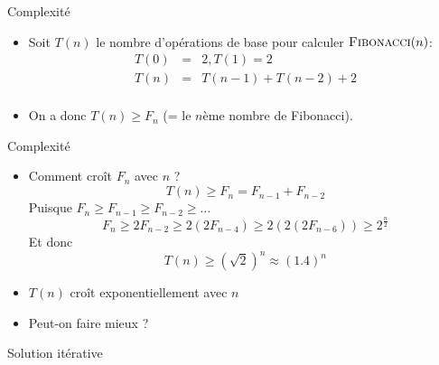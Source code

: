 \begin{frame}{Complexité}
\begin{center}
\end{center}

\bigskip

\begin{itemize}
\item Soit $T(n)$ le nombre d'opérations de base pour calculer $\textnormal{\scshape Fibonacci}(n)$:
\begin{eqnarray*}
T(0) & = & 2, T(1)=2\\
T(n) & = & T(n-1)+T(n-2)+2\\
\end{eqnarray*}
\item On a donc $T(n)\geq F_n$ (= le $n$ème nombre de Fibonacci).
\end{itemize}

\end{frame}

\begin{frame}{Complexité}

\begin{itemize}
\item Comment croît $F_n$ avec $n$ ?
$$T(n)\geq F_n=F_{n-1}+F_{n-2}$$
Puisque $F_n\geq F_{n-1}\geq F_{n-2}\geq\ldots$
$$F_n\geq 2 F_{n-2}\geq 2(2 F_{n-4})\geq 2(2(2 F_{n-6})) \geq 2^{\frac{n}{2}}$$
Et donc
$$T(n)\geq (\sqrt{2})^n \approx (1.4)^n$$
\item $T(n)$ croît \alert{exponentiellement} avec $n$

\bigskip

\item Peut-on faire mieux ?
\end{itemize}
\end{frame}

\begin{frame}{Solution itérative}

\begin{center}
\end{center}


\end{frame}

